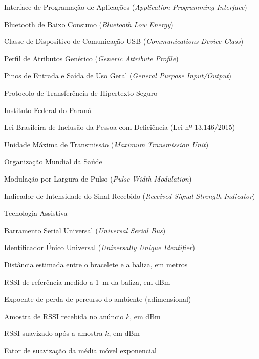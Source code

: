 \listoffigures*
\cleardoublepage

\listofquadros*
\cleardoublepage

\listoftables*
\cleardoublepage

\begin{siglas}
  \item[API] Interface de Programação de Aplicações (\textit{Application Programming Interface})
  \item[BLE] Bluetooth de Baixo Consumo (\textit{Bluetooth Low Energy})
  \item[CDC] Classe de Dispositivo de Comunicação USB (\textit{Communications Device Class})
  \item[GATT] Perfil de Atributos Genérico (\textit{Generic Attribute Profile})
  \item[GPIO] Pinos de Entrada e Saída de Uso Geral (\textit{General Purpose Input/Output})
  \item[HTTPS] Protocolo de Transferência de Hipertexto Seguro
  \item[IFPR] Instituto Federal do Paraná
  \item[LBI] Lei Brasileira de Inclusão da Pessoa com Deficiência (Lei nº 13.146/2015)
  \item[MTU] Unidade Máxima de Transmissão (\textit{Maximum Transmission Unit})
  \item[OMS] Organização Mundial da Saúde
  \item[PWM] Modulação por Largura de Pulso (\textit{Pulse Width Modulation})
  \item[RSSI] Indicador de Intensidade do Sinal Recebido (\textit{Received Signal Strength Indicator})
  \item[TA] Tecnologia Assistiva
  \item[USB] Barramento Serial Universal (\textit{Universal Serial Bus})
  \item[UUID] Identificador Único Universal (\textit{Universally Unique Identifier})
\end{siglas}

\begin{simbolos}
  \item[$d$] Distância estimada entre o bracelete e a baliza, em metros
  \item[$A$] RSSI de referência medido a 1~m da baliza, em dBm
  \item[$n$] Expoente de perda de percurso do ambiente (adimensional)
  \item[$r_k$] Amostra de RSSI recebida no anúncio $k$, em dBm
  \item[$R_k$] RSSI suavizado após a amostra $k$, em dBm
  \item[$\alpha$] Fator de suavização da média móvel exponencial
\end{simbolos}
